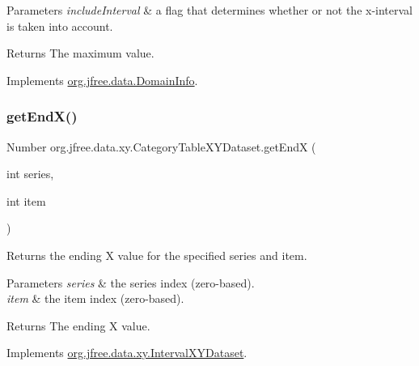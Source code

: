 \begin{DoxyParams}{Parameters}
{\em include\+Interval} & a flag that determines whether or not the x-\/interval is taken into account.\\
\hline
\end{DoxyParams}
\begin{DoxyReturn}{Returns}
The maximum value. 
\end{DoxyReturn}


Implements \mbox{\hyperlink{interfaceorg_1_1jfree_1_1data_1_1_domain_info_a00e455f8db5bd8515266000cacc74e89}{org.\+jfree.\+data.\+Domain\+Info}}.

\mbox{\label{classorg_1_1jfree_1_1data_1_1xy_1_1_category_table_x_y_dataset_aefff418737db29aec9769d4d2061c0d1}} 
\subsubsection{\texorpdfstring{get\+End\+X()}{getEndX()}}
{\footnotesize\ttfamily Number org.\+jfree.\+data.\+xy.\+Category\+Table\+X\+Y\+Dataset.\+get\+EndX (\begin{DoxyParamCaption}\item[{int}]{series,  }\item[{int}]{item }\end{DoxyParamCaption})}

Returns the ending X value for the specified series and item.


\begin{DoxyParams}{Parameters}
{\em series} & the series index (zero-\/based). \\
\hline
{\em item} & the item index (zero-\/based).\\
\hline
\end{DoxyParams}
\begin{DoxyReturn}{Returns}
The ending X value. 
\end{DoxyReturn}


Implements \mbox{\hyperlink{interfaceorg_1_1jfree_1_1data_1_1xy_1_1_interval_x_y_dataset_a93161a6d6c1db37cfac030239c62ab0a}{org.\+jfree.\+data.\+xy.\+Interval\+X\+Y\+Dataset}}.

